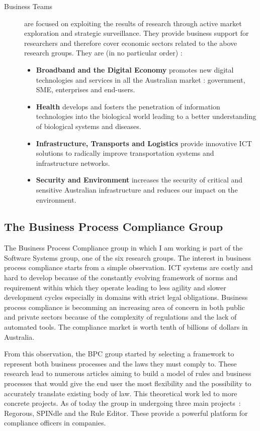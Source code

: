 \documentclass[10pt]{article}
\begin{document}
\begin{description}
\item[Business Teams] are focused on exploiting the results of research through active market exploration and strategic surveillance. They provide business support for researchers and therefore cover economic sectors related to the above research groups. They are (in no particular order) :
\begin{itemize}
\item \textbf{Broadband and the Digital Economy} promotes new digital technologies and services in all the Australian market : government, SME, enterprises and end-users.
\item \textbf{Health} develops and fosters the penetration of information technologies into the biological world leading to a better understanding of biological systems and diseases.
\item \textbf{Infrastructure, Transports and Logistics} provide innovative ICT solutions to radically improve transportation systems and infrastructure networks.
\item \textbf{Security and Environment} increases the security of critical and sensitive Australian infrastructure and reduces our impact on the environment.
\end{itemize}
\end{description}

\subsection{The Business Process Compliance Group}

The Business Process Compliance group in which I am working is part of the Software Systems group, one of the six research groups. The interest in business process compliance starts from a simple observation. ICT systems are costly and hard to develop because of the constantly evolving framework of norms and requirement within which they operate leading to less agility and slower development cycles especially in domains with strict legal obligations. Business process compliance is becomming an increasing area of concern in both public and private sectors because of the complexity of regulations and the lack of automated tools. The compliance market is worth tenth of billions of dollars in Australia.\autocite{BPCWebsite}

From this observation, the BPC group started by selecting a framework to represent both business processes and the laws they must comply to. These research lead to numerous articles aiming to build a model of rules and business processes that would give the end user the most flexibility and the possibility to accurately translate existing body of law. This theoretical work led to more concrete projects. As of today the group in undergoing three main projects~: Regorous, SPINdle and the Rule Editor. These provide a powerful platform for compliance officers in companies.
\end{document}
